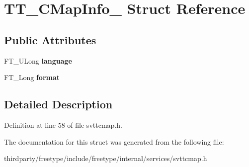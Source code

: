 \hypertarget{struct_t_t___c_map_info__}{}\section{T\+T\+\_\+\+C\+Map\+Info\+\_\+ Struct Reference}
\label{struct_t_t___c_map_info__}
\subsection*{Public Attributes}
\begin{DoxyCompactItemize}
\item 
\mbox{\label{struct_t_t___c_map_info___a4096f460af57f87cb9434a411c502d86}} 
F\+T\+\_\+\+U\+Long {\bfseries language}
\item 
\mbox{\label{struct_t_t___c_map_info___a122d56b4755597f134fcf4865cb0a4fc}} 
F\+T\+\_\+\+Long {\bfseries format}
\end{DoxyCompactItemize}


\subsection{Detailed Description}


Definition at line 58 of file svttcmap.\+h.



The documentation for this struct was generated from the following file\+:\begin{DoxyCompactItemize}
\item 
thirdparty/freetype/include/freetype/internal/services/svttcmap.\+h\end{DoxyCompactItemize}
